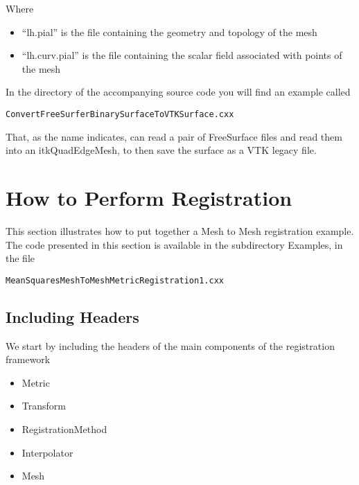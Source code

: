\documentclass{InsightArticle}
\begin{document}
Where 

\begin{itemize}
\item ``lh.pial'' is the file containing the geometry and topology of the mesh
\item ``lh.curv.pial'' is the file containing the scalar field associated with points of the mesh
\end{itemize}

In the  directory of the accompanying source code you will find an example called

\begin{verbatim} 
ConvertFreeSurferBinarySurfaceToVTKSurface.cxx
\end{verbatim} 

That, as the name indicates, can read a pair of FreeSurface files and read them
into an itkQuadEdgeMesh, to then save the surface as a VTK legacy file.


\section{How to Perform Registration}

This section illustrates how to put together a Mesh to Mesh registration example. The code presented in this section is available in the subdirectory Examples, in the file

\begin{verbatim} 
MeanSquaresMeshToMeshMetricRegistration1.cxx
\end{verbatim} 

\subsection{Including Headers}

We start by including the headers of the main components of the registration framework

\begin{itemize}
\item Metric
\item Transform
\item RegistrationMethod
\item Interpolator
\item Mesh
\end{itemize}

\begin{center}

\end{center}
\end{document}
